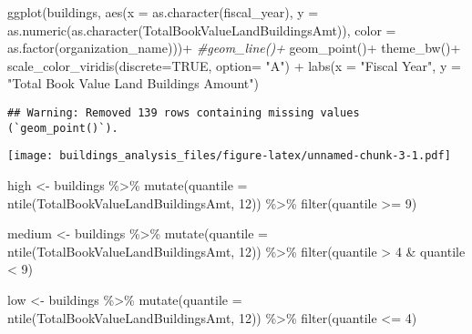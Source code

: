 \documentclass[
]{article}
\newenvironment{Shaded}{\begin{snugshade}}{\end{snugshade}}
\newcommand{\AttributeTok}[1]{\textcolor[rgb]{0.77,0.63,0.00}{#1}}
\newcommand{\CommentTok}[1]{\textcolor[rgb]{0.56,0.35,0.01}{\textit{#1}}}
\newcommand{\ConstantTok}[1]{\textcolor[rgb]{0.00,0.00,0.00}{#1}}
\newcommand{\DecValTok}[1]{\textcolor[rgb]{0.00,0.00,0.81}{#1}}
\newcommand{\FunctionTok}[1]{\textcolor[rgb]{0.00,0.00,0.00}{#1}}
\newcommand{\NormalTok}[1]{#1}
\newcommand{\OtherTok}[1]{\textcolor[rgb]{0.56,0.35,0.01}{#1}}
\newcommand{\SpecialCharTok}[1]{\textcolor[rgb]{0.00,0.00,0.00}{#1}}
\newcommand{\StringTok}[1]{\textcolor[rgb]{0.31,0.60,0.02}{#1}}
\begin{document}
\begin{Shaded}
\begin{Highlighting}[]
  \FunctionTok{ggplot}\NormalTok{(buildings, }\FunctionTok{aes}\NormalTok{(}\AttributeTok{x =} \FunctionTok{as.character}\NormalTok{(fiscal\_year), }\AttributeTok{y =} \FunctionTok{as.numeric}\NormalTok{(}\FunctionTok{as.character}\NormalTok{(TotalBookValueLandBuildingsAmt)), }\AttributeTok{color =} \FunctionTok{as.factor}\NormalTok{(organization\_name)))}\SpecialCharTok{+}
    \CommentTok{\#geom\_line()+}
    \FunctionTok{geom\_point}\NormalTok{()}\SpecialCharTok{+}
    \FunctionTok{theme\_bw}\NormalTok{()}\SpecialCharTok{+}
    \FunctionTok{scale\_color\_viridis}\NormalTok{(}\AttributeTok{discrete=}\ConstantTok{TRUE}\NormalTok{, }\AttributeTok{option=} \StringTok{"A"}\NormalTok{) }\SpecialCharTok{+}
    \FunctionTok{labs}\NormalTok{(}\AttributeTok{x =} \StringTok{"Fiscal Year"}\NormalTok{, }\AttributeTok{y =} \StringTok{"Total Book Value Land Buildings Amount"}\NormalTok{)}
\end{Highlighting}
\end{Shaded}

\begin{verbatim}
## Warning: Removed 139 rows containing missing values (`geom_point()`).
\end{verbatim}

\texttt{[image: buildings\_analysis\_files/figure-latex/unnamed-chunk-3-1.pdf]}

\begin{Shaded}
\begin{Highlighting}[]
\NormalTok{high }\OtherTok{\textless{}{-}}\NormalTok{ buildings }\SpecialCharTok{\%\textgreater{}\%} 
  \FunctionTok{mutate}\NormalTok{(}\AttributeTok{quantile =} \FunctionTok{ntile}\NormalTok{(TotalBookValueLandBuildingsAmt, }\DecValTok{12}\NormalTok{)) }\SpecialCharTok{\%\textgreater{}\%} 
  \FunctionTok{filter}\NormalTok{(quantile }\SpecialCharTok{\textgreater{}=} \DecValTok{9}\NormalTok{)}

\NormalTok{medium }\OtherTok{\textless{}{-}}\NormalTok{ buildings }\SpecialCharTok{\%\textgreater{}\%} 
  \FunctionTok{mutate}\NormalTok{(}\AttributeTok{quantile =} \FunctionTok{ntile}\NormalTok{(TotalBookValueLandBuildingsAmt, }\DecValTok{12}\NormalTok{)) }\SpecialCharTok{\%\textgreater{}\%} 
  \FunctionTok{filter}\NormalTok{(quantile }\SpecialCharTok{\textgreater{}} \DecValTok{4} \SpecialCharTok{\&}\NormalTok{ quantile }\SpecialCharTok{\textless{}} \DecValTok{9}\NormalTok{)}

\NormalTok{low }\OtherTok{\textless{}{-}}\NormalTok{ buildings }\SpecialCharTok{\%\textgreater{}\%} 
  \FunctionTok{mutate}\NormalTok{(}\AttributeTok{quantile =} \FunctionTok{ntile}\NormalTok{(TotalBookValueLandBuildingsAmt, }\DecValTok{12}\NormalTok{)) }\SpecialCharTok{\%\textgreater{}\%} 
  \FunctionTok{filter}\NormalTok{(quantile }\SpecialCharTok{\textless{}=} \DecValTok{4}\NormalTok{)}
\end{Highlighting}
\end{Shaded}
\end{document}
